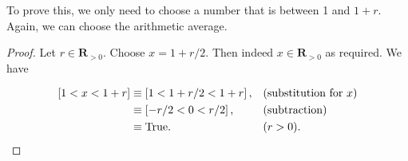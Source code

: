 \documentclass[12pt,fleqn,answers]{article}
\newcommand{\reals}{\mathbf{R}}
\newcommand{\true}{\mathrm{True}}
\newenvironment{myproof}
  {\begin{shaded}\begin{proof}}
  {\end{proof}\end{shaded}}
\begin{document}
To prove this, we only need to choose a number that is between 1 and $1+r$. Again, we can choose the arithmetic average.
\begin{myproof} Let $r \in \reals_{>0}$.  Choose $x= 1+r/2$. Then indeed $x \in \reals_{> 0}$ as required. We have

\begin{align*}
  \left[1 < x < 1+r \right] &\equiv \left[1 < 1+r/2 < 1+r \right],   && (\text{substitution for } x )\\
                                          & \equiv \left[-r/2 < 0  < r/2 \right],  && (\text{subtraction})  \\
                                          &\equiv \true.                                      && (r > 0). \qedhere
\end{align*}

\end{myproof}
\end{document}
